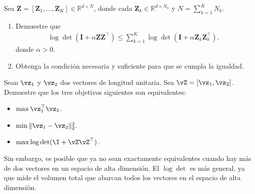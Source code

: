 \documentclass[../../book-main.tex]{subfiles}
\begin{document}

\begin{exercise}
    Sea $\bm Z = [\bm Z_1, \dots, \bm Z_K] \in \mathbb{R}^{d \times N}$,
    donde cada $\bm Z_k \in \mathbb{R}^{d \times N_k}$ y
    $N = \sum_{k=1}^K N_k$.

    \begin{enumerate}
        \item Demuestre que
            \begin{align*}
                \log\det\left( \bm I + \alpha \bm Z \bm Z^\top \right)
                \le
                \sum_{k=1}^K
                \log\det\left( \bm I + \alpha \bm Z_k \bm Z_k^\top \right),
            \end{align*}
            donde $\alpha > 0$.

        \item Obtenga la condición necesaria y suficiente
            para que se cumpla la igualdad.
    \end{enumerate}

\end{exercise}

\begin{exercise}
    Sean $\vz_1$ y $\vz_2$ dos vectores de longitud unitaria. Sea
    $\vZ = [\vz_1,
    \vz_2]$. Demuestre que los tres objetivos siguientes son equivalentes:
    \begin{itemize}
        \item $\max \vz_1^\top \vz_2$.
        \item $\min \|\vz_1 - \vz_2\|_2^2$.
        \item $\max \log \det (\I + \vZ\vZ^\top)$.
    \end{itemize}
    Sin embargo, es posible que ya no sean exactamente equivalentes cuando hay más
    de dos vectores en un espacio de alta dimensión. El $\log\det$ es más
    general, ya que mide el volumen total que abarcan todos los vectores en
    el espacio de alta dimensión.
\end{exercise}
\end{document}
